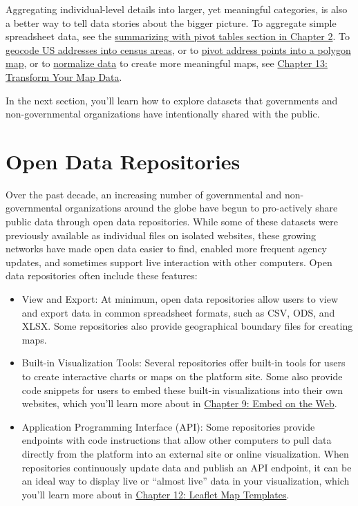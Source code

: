 \documentclass[
  english,
]{book}
\providecommand{\tightlist}{%
  \setlength{\itemsep}{0pt}\setlength{\parskip}{0pt}}
\begin{document}
Aggregating individual-level details into larger, yet meaningful categories, is also a better way to tell data stories about the bigger picture. To aggregate simple spreadsheet data, see the \href{pivot.html}{summarizing with pivot tables section in Chapter 2}. To \href{bulk-geocode.html}{geocode US addresses into census areas}, or to \href{pivot-point-to-polygon.html}{pivot address points into a polygon map}, or to \href{normalize.html}{normalize data} to create more meaningful maps, see \href{transform.html}{Chapter 13: Transform Your Map Data}.

In the next section, you'll learn how to explore datasets that governments and non-governmental organizations have intentionally shared with the public.

\hypertarget{opendata}{%
\section*{Open Data Repositories}\label{opendata}}

Over the past decade, an increasing number of governmental and non-governmental organizations around the globe have begun to pro-actively share public data through open data repositories. While some of these datasets were previously available as individual files on isolated websites, these growing networks have made open data easier to find, enabled more frequent agency updates, and sometimes support live interaction with other computers. Open data repositories often include these features:

\begin{itemize}
\tightlist
\item
  View and Export: At minimum, open data repositories allow users to view and export data in common spreadsheet formats, such as CSV, ODS, and XLSX. Some repositories also provide geographical boundary files for creating maps.
\item
  Built-in Visualization Tools: Several repositories offer built-in tools for users to create interactive charts or maps on the platform site. Some also provide code snippets for users to embed these built-in visualizations into their own websites, which you'll learn more about in \href{embed.html}{Chapter 9: Embed on the Web}.
\item
  Application Programming Interface (API): Some repositories provide endpoints with code instructions that allow other computers to pull data directly from the platform into an external site or online visualization. When repositories continuously update data and publish an API endpoint, it can be an ideal way to display live or ``almost live'' data in your visualization, which you'll learn more about in \href{leaflet.html}{Chapter 12: Leaflet Map Templates}.
\end{itemize}
\end{document}
